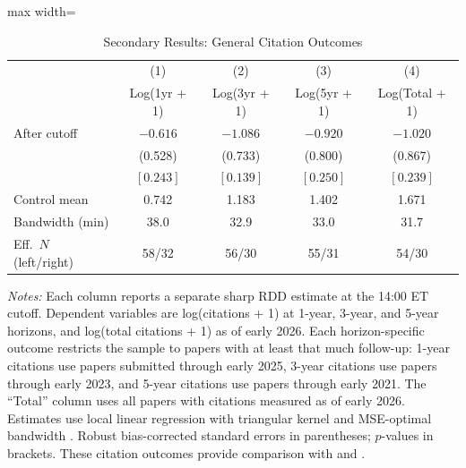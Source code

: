 \begin{table}[htbp]
\centering
\caption{Secondary Results: General Citation Outcomes}
\label{tab:citations}
\begin{adjustbox}{max width=\textwidth}
\begin{tabular}{lcccc}
\hline\hline
& (1) & (2) & (3) & (4) \\
& Log(1yr + 1) & Log(3yr + 1) & Log(5yr + 1) & Log(Total + 1) \\
\hline
After cutoff & $-0.616$ & $-1.086$ & $-0.920$ & $-1.020$ \\
& (0.528) & (0.733) & (0.800) & (0.867) \\
& $[0.243]$ & $[0.139]$ & $[0.250]$ & $[0.239]$ \\[6pt]
Control mean & 0.742 & 1.183 & 1.402 & 1.671 \\
Bandwidth (min) & 38.0 & 32.9 & 33.0 & 31.7 \\
Eff.\ $N$ (left/right) & 58/32 & 56/30 & 55/31 & 54/30 \\
\hline\hline
\end{tabular}
\end{adjustbox}
\begin{minipage}{0.95\textwidth}
\footnotesize
\textit{Notes:} Each column reports a separate sharp RDD estimate at the 14:00 ET cutoff. Dependent variables are log(citations + 1) at 1-year, 3-year, and 5-year horizons, and log(total citations + 1) as of early 2026. Each horizon-specific outcome restricts the sample to papers with at least that much follow-up: 1-year citations use papers submitted through early 2025, 3-year citations use papers through early 2023, and 5-year citations use papers through early 2021. The ``Total'' column uses all papers with citations measured as of early 2026. Estimates use local linear regression with triangular kernel and MSE-optimal bandwidth \citep{calonico2014}. Robust bias-corrected standard errors in parentheses; $p$-values in brackets. These citation outcomes provide comparison with \citet{feenberg2017} and \citet{haque2009}.
\end{minipage}
\end{table}
